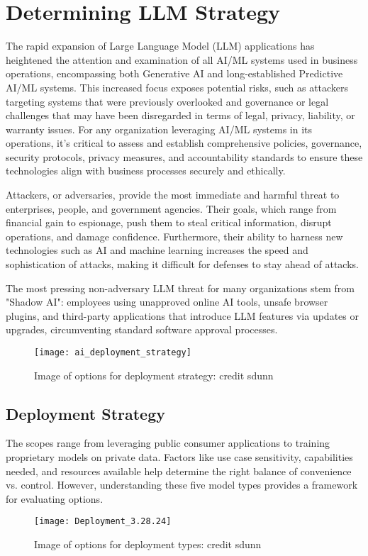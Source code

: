 

\headerimage
\chapter{Determining LLM Strategy}
The rapid expansion of Large Language Model (LLM) applications has heightened the attention and examination of all AI/ML systems used in business operations, encompassing both Generative AI and long-established Predictive AI/ML systems. This increased focus exposes potential risks, such as attackers targeting systems that were previously overlooked and governance or legal challenges that may have been disregarded in terms of legal, privacy, liability, or warranty issues. For any organization leveraging AI/ML systems in its operations, it's critical to assess and establish comprehensive policies, governance, security protocols, privacy measures, and accountability standards to ensure these technologies align with business processes securely and ethically.

Attackers, or adversaries, provide the most immediate and harmful threat to enterprises, people, and government agencies. Their goals, which range from financial gain to espionage, push them to steal critical information, disrupt operations, and damage confidence. Furthermore, their ability to harness new technologies such as AI and machine learning increases the speed and sophistication of attacks, making it difficult for defenses to stay ahead of attacks.

The most pressing non-adversary LLM threat for many organizations stem from "Shadow AI": employees using unapproved online AI tools, unsafe browser plugins, and third-party applications that introduce LLM features via updates or upgrades, circumventing standard software approval processes.

\begin{figure}[h]
  \centering
  \texttt{[image: ai\_deployment\_strategy]}
  \caption{Image of options for deployment strategy: credit sdunn}
  \label{fig:llm-deployment-strategy}
\end{figure}

\clearpage

\section{Deployment Strategy}
The scopes range from leveraging public consumer applications to training proprietary models on private data. Factors like use case sensitivity, capabilities needed, and resources available help determine the right balance of convenience vs. control. However, understanding these five model types provides a framework for evaluating options.

\begin{figure}[h]
  \centering
  \texttt{[image: Deployment\_3.28.24]}
  \caption{Image of options for deployment types: credit sdunn}
  \label{fig:llm-deployment-types}
\end{figure}
